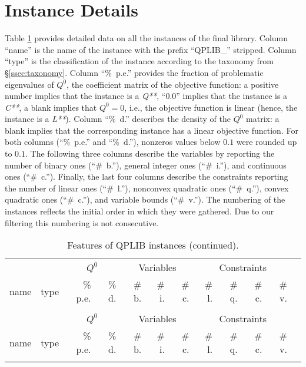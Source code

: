 
\section{Instance Details}\label{sec:instance_details}


Table \ref{tab:A1} provides detailed data on all the instances of the final library.
Column ``name'' is the name of the instance with the prefix ``QPLIB\_'' stripped.
Column ``type'' is the classification of the instance according to the taxonomy from \S\ref{ssec:taxonomy}.
Column ``\%~p.e.'' provides the fraction of {problematic} eigenvalues of $Q^0$, the coefficient matrix of the objective function: a positive number implies that the instance is a \textit{Q**}, ``0.0'' implies that the instance is a \textit{C**}, a blank implies that $Q^0 = 0$, i.e., the objective function is linear (hence, the instance is a \textit{L**}).
Column ``\%~d.'' describes the density of the $Q^0$ matrix: a blank implies that the corresponding instance has a linear objective function.
For both columns (``\%~p.e.'' and ``\%~d.''), nonzeros values below $0.1$ were rounded up to $0.1$.
The following three columns describe the variables by reporting the number of binary ones (``\#~b.''), general integer ones (``\#~i.''), and continuous ones (``\#~c.''). Finally, the last four columns describe the constraints reporting the number of linear ones (``\#~l.''), nonconvex quadratic ones (``\#~q.''), convex quadratic ones (``\#~c.''), and variable bounds (``\#~v.'').
{The numbering of the instances reflects the initial order in which they were gathered. Due to our filtering this numbering is not consecutive.}


{\tiny
\begin{longtable}[c]{llrrrrrrrrrr}
\caption{Features of QPLIB instances.} \\
\toprule
& & \multicolumn{2}{c}{$Q^0$} & \multicolumn{3}{c}{Variables} & \multicolumn{4}{c}{Constraints} \\
\cmidrule(lr){3-4} \cmidrule(lr){5-7} \cmidrule(lr){8-11}
name & type & \% p.e. & \% d. & \# b. & \# i. & \# c. & \# l. & \# q. & \# c. & \# v. \\
\midrule
\endfirsthead

\caption{Features of QPLIB instances (continued).} \\
\toprule
& & \multicolumn{2}{c}{$Q^0$} & \multicolumn{3}{c}{Variables} & \multicolumn{4}{c}{Constraints} \\
\cmidrule(lr){3-4} \cmidrule(lr){5-7} \cmidrule(lr){8-11}
name & type & \% p.e. & \% d. & \# b. & \# i. & \# c. & \# l. & \# q. & \# c. & \# v. \\
\midrule
\endhead



\bottomrule
\label{tab:A1}
\end{longtable}
}




